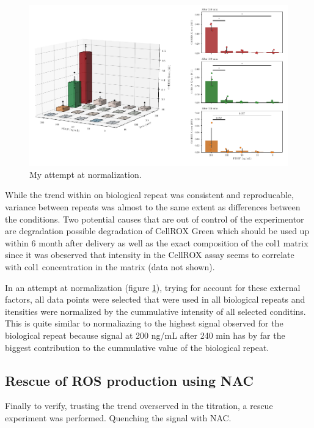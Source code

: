    \begin{figure}[h]
    \capstart
        \centering
    	\includegraphics{Abbildung/CellROX_titration_norm.pdf}
    	\begin{minipage}{\captionwidth}
    		\caption[cellROX_titration_norm]{ \newline My attempt at normalization.}
    		\label{fig:cellROX_titration_norm}
    	\end{minipage}
    \end{figure}

    While the trend within on biological repeat was consistent and reproducable, variance between repeats was almost to the same extent as differences between the conditions. Two potential causes that are out of control of the experimentor are degradation possible degradation of CellROX Green which should be used up within 6 month after delivery as well as the exact composition of the \ac{col1} matrix since it was obeserved that intensity in the CellROX assay seems to correlate with \ac{col1} concentration in the matrix (data not shown).

    In an attempt at normalization (figure \ref{fig:cellROX_titration_norm}), trying for account for these external factors, all data points were selected that were used in all biological repeats and itensities were normalized by the cummulative intensity of all selected conditins. This is quite similar to normaliazing to the highest signal observed for the biological repeat because signal at 200 ng/mL after 240 min has by far the biggest contribution to the cummulative value of the biological repeat.

    \subsection{Rescue of ROS production using NAC}
    Finally to verify, trusting the trend overserved in the titration, a rescue experiment was performed. Quenching the signal with NAC.

